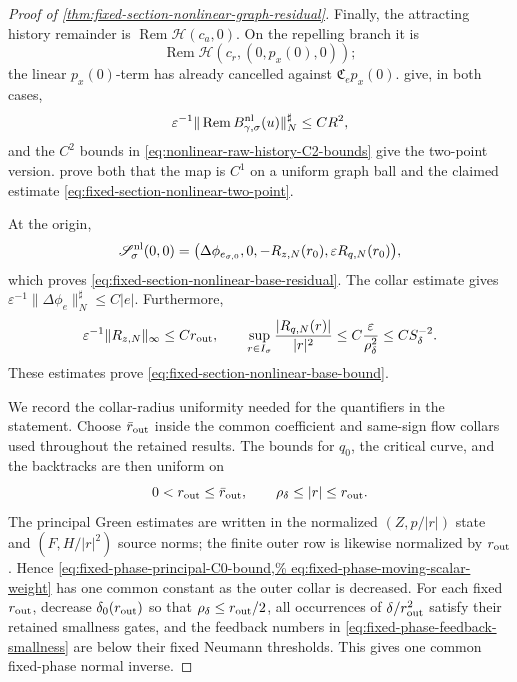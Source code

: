 \begin{proof}[Proof of
\cref{thm:fixed-section-nonlinear-graph-residual}]
Finally, the attracting history remainder is
\(\operatorname{Rem}\mathscr H(c_a,0)\).  On the repelling branch it is
\[
 \operatorname{Rem}\mathscr H
       (c_r,(0,p_x(0),0));
\]
the linear \(p_x(0)\)-term has already cancelled against
\(\mathfrak C_ep_x(0)\).  
give, in both cases,
\begin{equation}
 \varepsilon^{-1}
 \|\operatorname{Rem}B_{\gamma,\sigma}^{\rm nl}(u)\|_N^\sharp
 \le CR^2,                                       \label{eq:proof-fixed-section-history-remainder}
\end{equation}
and the \(C^2\) bounds in
\cref{eq:nonlinear-raw-history-C2-bounds} give the two-point version.
prove both that the map is \(C^1\) on a uniform graph ball and the claimed
estimate \cref{eq:fixed-section-nonlinear-two-point}.

At the origin,
\[
 \mathscr S_\sigma^{\rm nl}(0,0)
 =\bigl(\Delta\phi_{e_{\sigma,0}},0,
                    -R_{z,N}(r_0),\varepsilon R_{q,N}(r_0)\bigr),
\]
which proves \cref{eq:fixed-section-nonlinear-base-residual}.  The collar
estimate gives
\(\varepsilon^{-1}\|\Delta\phi_e\|_N^\sharp\le C|e|\).
Furthermore,
\[
 \varepsilon^{-1}\|R_{z,N}\|_\infty\le Cr_{\rm out},
 \qquad
 \sup_{r\in I_\sigma}\frac{|R_{q,N}(r)|}{|r|^2}
 \le C\frac{\varepsilon}{\rho_\delta^2}
 \le CS_\delta^{-2}.
\]
These estimates prove
\cref{eq:fixed-section-nonlinear-base-bound}.

We record the collar-radius uniformity needed for the quantifiers in the
statement.  Choose \(\bar r_{\rm out}\) inside the common coefficient and
same-sign flow collars used throughout the retained results.  The bounds
for \(q_0\), the critical curve, and the backtracks are then uniform on
\[
 0<r_{\rm out}\le\bar r_{\rm out},
 \qquad \rho_\delta\le |r|\le r_{\rm out}.
\]
The principal Green estimates are written in the normalized
\((Z,p/|r|)\) state and \((F,H/|r|^2)\) source norms; the finite outer
row is likewise normalized by \(r_{\rm out}\).  Hence
\cref{eq:fixed-phase-principal-C0-bound,%
eq:fixed-phase-moving-scalar-weight}
has one common constant as the outer collar is decreased.  For each fixed
\(r_{\rm out}\), decrease \(\delta_0(r_{\rm out})\) so that
\(\rho_\delta\le r_{\rm out}/2\), all occurrences of
\(\delta/r_{\rm out}^2\) satisfy their retained smallness gates, and the
feedback numbers in
\cref{eq:fixed-phase-feedback-smallness} are below their fixed Neumann
thresholds.  This gives one common fixed-phase normal inverse.


\end{proof}
